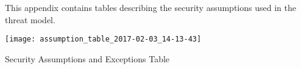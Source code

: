 

This appendix contains tables describing the security assumptions used in the threat model.

\begin{table*}[h]
    \texttt{[image: assumption\_table\_2017-02-03\_14-13-43]}
    \caption{Security Assumptions and Exceptions Table}
    \label{tab:sec_assumpt}
\end{table*}

\vfill